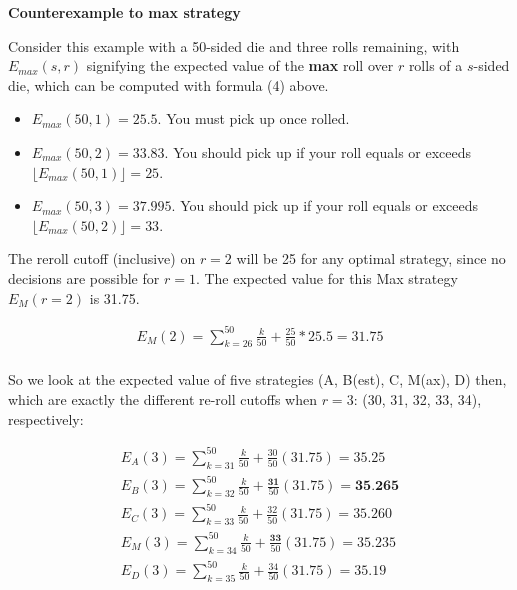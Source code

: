 \documentclass[11pt, oneside]{article} 	%
\begin{document}
\textbf{Counterexample to max strategy}

Consider this example with a 50-sided die and three rolls remaining, with $E_{max}(s, r)$ signifying the expected value of the \textbf{max} roll over $r$ rolls of a $s$-sided die, which can be computed with formula (4) above.

\begin{itemize}
\item $E_{max}(50, 1) = 25.5$. You must pick up once rolled.
\item $E_{max}(50,2) = 33.83$. You should pick up if your roll equals or exceeds $\lfloor E_{max}(50, 1)\rfloor = 25$.
\item $E_{max}(50,3) = 37.995$. You should pick up if your roll equals or exceeds $\lfloor E_{max}(50,2) \rfloor = 33$.
\end{itemize}
 

The reroll cutoff (inclusive) on $r=2$ will be 25 for any optimal strategy, since no decisions are possible for $r=1$.  The expected value for this Max strategy $E_M(r  = 2)$ is 31.75.

\begin{align}
E_M(2)  = \sum_{k=26}^{50} \frac{k}{50} + \frac{25}{50}*25.5 = 31.75 \\
\end{align}

So we look at the expected value of five strategies (A, B(est), C, M(ax), D) then, which are exactly the different re-roll cutoffs when $r=3$: (30, 31, 32, 33, 34), respectively:

\begin{align}
E_A(3) = \sum_{k=31}^{50} \frac{k}{50} + \frac{30}{50} (31.75) = 35.25 \\
E_B(3) = \sum_{k=32}^{50} \frac{k}{50} + \frac{\textbf{31}}{50} (31.75) = \textbf{35.265} \\
E_C(3) =  \sum_{k=33}^{50} \frac{k}{50} + \frac{32}{50} (31.75) = 35.260 \\
E_M(3) = \sum_{k=34}^{50} \frac{k}{50} + \frac{\textbf{33}}{50}(31.75) = 35.235 \\
E_D(3) = \sum_{k=35}^{50} \frac{k}{50} + \frac{34}{50} (31.75) = 35.19 \\
\end{align}
\end{document}
